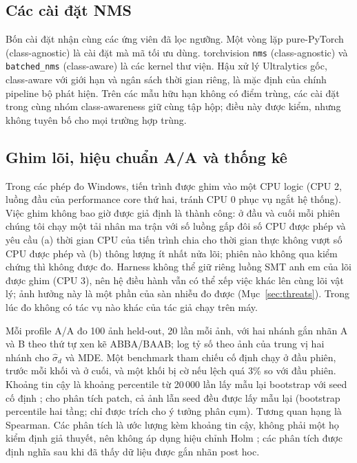 \documentclass[a4paper,fleqn]{cas-dc}
\begin{document}
\subsection{Các cài đặt NMS}
Bốn cài đặt nhận cùng các ứng viên đã lọc ngưỡng. Một vòng lặp pure-PyTorch (class-agnostic) là cài đặt mà mã tối ưu dùng. torchvision \texttt{nms} (class-agnostic) và \texttt{batched\_nms} (class-aware) là các kernel thư viện. Hậu xử lý Ultralytics gốc, class-aware với giới hạn và ngân sách thời gian riêng, là mặc định của chính pipeline bộ phát hiện. Trên các mẫu hữu hạn không có điểm trùng, các cài đặt trong cùng nhóm class-awareness giữ cùng tập hộp; điều này được kiểm, nhưng không tuyên bố cho mọi trường hợp trùng.

\subsection{Ghim lõi, hiệu chuẩn A/A và thống kê}
Trong các phép đo Windows, tiến trình được ghim vào một CPU logic (CPU 2, luồng đầu của performance core thứ hai, tránh CPU 0 phục vụ ngắt hệ thống). Việc ghim không bao giờ được giả định là thành công: ở đầu và cuối mỗi phiên chúng tôi chạy một tải nhân ma trận với số luồng gấp đôi số CPU được phép và yêu cầu (a) thời gian CPU của tiến trình chia cho thời gian thực không vượt số CPU được phép và (b) thông lượng ít nhất nửa lõi; phiên nào không qua kiểm chứng thì không được đo. Harness không thể giữ riêng luồng SMT anh em của lõi được ghim (CPU 3), nên hệ điều hành vẫn có thể xếp việc khác lên cùng lõi vật lý; ảnh hưởng này là một phần của sàn nhiễu đo được (Mục~\ref{sec:threats}). Trong lúc đo không có tác vụ nào khác của tác giả chạy trên máy.

Mỗi profile A/A đo 100 ảnh held-out, 20 lần mỗi ảnh, với hai nhánh gắn nhãn A và B theo thứ tự xen kẽ ABBA/BAAB; log tỷ số theo ảnh của trung vị hai nhánh cho $\hat\sigma_d$ và MDE. Một benchmark tham chiếu cố định chạy ở đầu phiên, trước mỗi khối và ở cuối, và một khối bị cờ nếu lệch quá 3\% so với đầu phiên. Khoảng tin cậy là khoảng percentile từ 20\,000 lần lấy mẫu lại bootstrap với seed cố định \cite{efron1979bootstrap}; cho phân tích patch, cả ảnh lẫn seed đều được lấy mẫu lại (bootstrap percentile hai tầng; \cite{cameron2008cluster} chỉ được trích cho ý tưởng phân cụm). Tương quan hạng là Spearman. Các phân tích là ước lượng kèm khoảng tin cậy, không phải một họ kiểm định giả thuyết, nên không áp dụng hiệu chỉnh Holm \cite{holm1979}; các phân tích được định nghĩa sau khi đã thấy dữ liệu được gắn nhãn post hoc.
\end{document}
